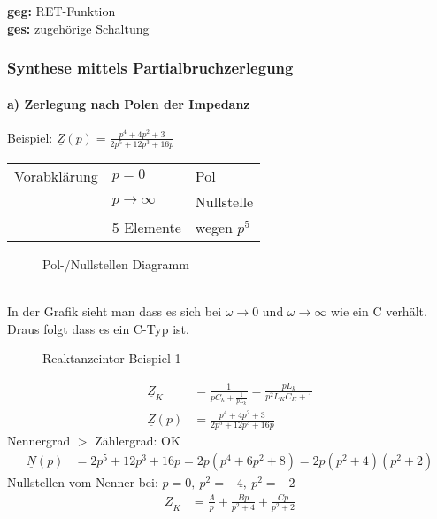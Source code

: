 

\textbf{geg:} RET-Funktion\\
\textbf{ges:} zugehörige Schaltung\\


\subsubsection{Synthese mittels Partialbruchzerlegung}
\paragraph{a) Zerlegung nach Polen der Impedanz}
Beispiel: $\underline{Z}(p) = \frac{p^4+4p^2+3}{2p^5+12p^3+16p}$\\
\begin{tabular}{lll}
	Vorabklärung & $p=0$ & Pol \\
	& $p \rightarrow \infty$ & Nullstelle \\
	& 5 Elemente & wegen $p^5$ \\
\end{tabular}
\begin{figure}[!h]
	\centering
	
	\caption{Pol-/Nullstellen Diagramm}
	\label{fig:RetPolNullstelle}
\end{figure}\\
In der Grafik sieht man dass es sich bei $\omega \rightarrow 0$ und $\omega
\rightarrow \infty$ wie ein C verhält. Draus folgt dass es ein C-Typ ist.\\
\begin{figure}[!h]
	\centering
	
	\caption{Reaktanzeintor Beispiel 1}
	\label{fig:RetSyntheseBsp1S}
\end{figure}
\begin{align}
\underline{Z}_K&=\frac{1}{pC_k+\frac{1}{pL_k}} =
\frac{pL_k}{p^2L_KC_K+1}\nonumber\\
\underline{Z}(p)&=\frac{p^4+4p^2+3}{2p^5+12p^3+16p}\nonumber
\end{align}
Nennergrad $>$ Zählergrad: OK\\
\begin{align}
\underline{N}(p)&=2p^5+12p^3+16p=2p(p^4+6p^2+8)=2p(p^2+4)(p^2+2)\nonumber
\end{align}
Nullstellen vom Nenner bei: $p=0,\ p^2=-4,\ p^2=-2$\\
\begin{align}
\underline{Z}_K&=\frac{A}{p}+\frac{Bp}{p^2+4}+\frac{Cp}{p^2+2}\nonumber
\end{align}
